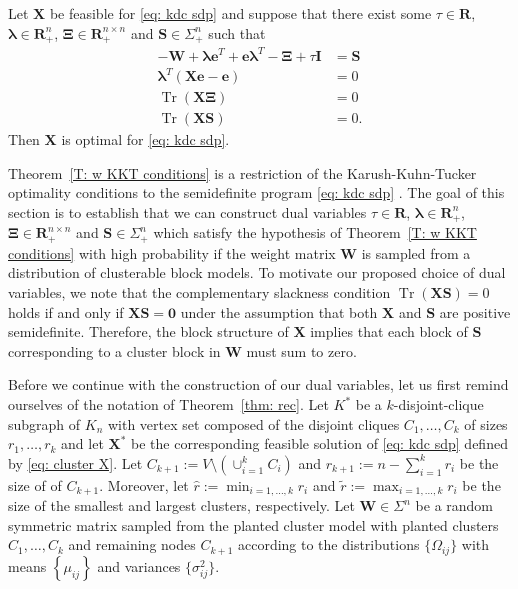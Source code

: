 \documentclass[twoside,11pt]{article}
\renewcommand{\S}{\mathbf{S}}
\newcommand{\R}{\mathbf{R}}
\DeclareMathOperator{\tr}{{Tr}}
\newcommand{\e}{\bs {e}}
\newcommand{\bs}{\boldsymbol}
\newcommand{\X}{\bs {X}}
\newcommand{\W}{\bs {W}}
\newcommand{\0}{\bs{0}}
\newcommand{\bra}[1]{\ensuremath{\left\{ #1 \right\}}} %
\begin{document}
{\renewcommand{\S}{\bs{S}}
\begin{theorem}
	\label{T:  w KKT conditions}
	Let $\X$ be feasible for \eqref{eq: kdc sdp} and suppose that
	there exist some $\tau \in \R$, $\bs\lambda \in \R^n_+$, $\bs\Xi \in \R^{n\times n}_{+}$ and $\S \in \Sigma^n_+$ such that
	\begin{align}
	- \W + \bs\lambda \e^T + \e \bs\lambda^T - \bs\Xi + \tau \bs I &= \S \label{E: w dual feas} \\
	\bs\lambda^T (\X\e - \e)  &= 0  \label{E: w CS rowsum} \\
	\tr(\X  \bs\Xi) &= 0 \label{E: w CS nonneg} \\
	\tr (\X \S)  &= 0. \label{E: w CS sdp}
	\end{align}
	Then $\X$ is optimal for \eqref{eq: kdc sdp}.
\end{theorem}

Theorem~\ref{T: w KKT conditions} is a restriction of the Karush-Kuhn-Tucker optimality conditions
to the semidefinite program \eqref{eq: kdc sdp} \citep[see, for example,][Section 5.5.3]{boyd2009convex}.
The goal of this section is to establish that we can construct dual variables $\tau \in \R$, $\bs\lambda \in \R^n_+$, $\bs\Xi \in \R^{n\times n}_{+}$ and $\S \in \Sigma^n_+$
which satisfy the hypothesis
of Theorem~\ref{T: w KKT conditions} with high probability if the weight matrix \(\W\) is
sampled from a distribution of clusterable block models.
To motivate our proposed choice of dual variables, we note that
the complementary slackness condition \(\tr(\X\S) = 0\) holds if and only if \(\X\S = \bs 0\) under the assumption that
both \(\X\) and \(\S\) are positive semidefinite.
Therefore, the block structure of \(\X\) implies that
each block of \(\S\) corresponding to a cluster block in \(\W\) must sum to zero.

Before we continue with the construction of our dual variables, let us first remind ourselves
of the notation of Theorem~\ref{thm: rec}.
Let $K^*$ be a $k$-disjoint-clique subgraph of $K_n$ with vertex set composed of the disjoint cliques $C_1, \dots, C_k$ of sizes $r_1, \dots, r_k$  and let
$\X^*$ be the corresponding feasible solution of \eqref{eq: kdc sdp} defined by \eqref{eq: cluster X}.
Let $C_{k+1} := V \setminus  (\cup^k_{i=1} C_i)$ and $r_{k+1} := n - \sum_{i=1}^k r_i$ be the size of
of  \(C_{k+1}\).
Moreover, let $\hat r := \min_{i=1, \dots, k} r_i$ and
\( \tilde r := \max_{i=1,\dots, k} r_i\)  be the size of the smallest and largest clusters,
respectively.
Let $\W \in \Sigma^n$ be a random symmetric matrix
sampled from the planted cluster model with planted clusters \(C_1, \dots, C_k\) and
remaining nodes \(C_{k+1}\)
according to the distributions \(\{\Omega_{ij}\}\) with means \( \bra{\mu_{ij}} \)
and variances $\{\sigma^2_{ij}\}$.

}
\end{document}
